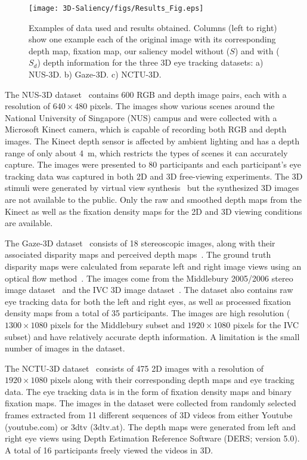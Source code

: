 \begin{figure}[t]
\centering
\texttt{[image: 3D-Saliency/figs/Results\_Fig.eps]}
\makeatletter
\let\@currsize\normalsize
\caption{Examples of data used and results obtained. Columns (left to right) show one example each of the original image with its corresponding depth map, fixation map, our saliency model without ($S$) and with ($S_d$) depth information for the three 3D eye tracking datasets: a) NUS-3D. b) Gaze-3D. c) NCTU-3D.}
\label{Fig:Results}
\end{figure}

The NUS-3D dataset~\citep{Lang_etal12} contains 600 RGB and depth image pairs, each with a resolution of $640\times480$ pixels. The images show various scenes around the National University of Singapore (NUS) campus and were collected with a Microsoft Kinect camera, which is capable of recording both RGB and depth images. The Kinect depth sensor is affected by ambient lighting and has a depth range of only about 4~m, which restricts the types of scenes it can accurately capture. The images were presented to 80 participants and each participant's eye tracking data was captured in both 2D and 3D free-viewing experiments. The 3D stimuli were generated by virtual view synthesis~\cite[see][for details]{Lang_etal12} but the synthesized 3D images are not available to the public. Only the raw and smoothed depth maps from the Kinect as well as the fixation density
maps for the 2D and 3D viewing conditions are available.

The Gaze-3D dataset~\citep{Wang_etal13} consists of 18 stereoscopic images, along with their associated disparity maps and perceived depth maps~\cite[perceived depth is computed from raw disparity by taking into account viewing distance and display properties; see][for details]{Wang_etal13}. The ground truth disparity maps were calculated from separate left and right image views using an optical flow method~\citep{Werlberger_etal09}. The images come from the Middlebury 2005/2006 stereo image dataset~\citep{Scharstein_Pal07} and the IVC 3D image dataset~\citep{Urvoy_etal12}. The dataset also contains raw eye tracking data for both the left and right eyes, as well as processed fixation density maps from a total of 35 participants. The images are high resolution ($1300\times1080$ pixels for the Middlebury subset and $1920\times1080$ pixels for the IVC subset) and have relatively accurate depth information. A limitation is the small number of images in the dataset.

The NCTU-3D dataset~\citep{Ma_Hang15} consists of 475 2D images with a resolution of $1920\times1080$ pixels along with their corresponding depth maps and eye tracking data. The eye tracking data is in the form of fixation density maps and binary fixation maps. The images in the dataset were collected from randomly selected frames extracted from 11 different sequences of 3D videos from either Youtube (youtube.com) or 3dtv (3dtv.at). The depth maps were generated from left and right eye views using Depth Estimation Reference Software (DERS; version 5.0). A total of 16 participants freely viewed the videos in 3D.

